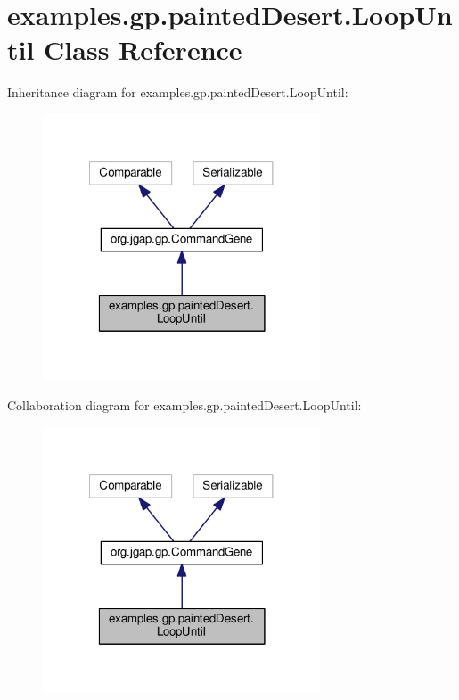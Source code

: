 \hypertarget{classexamples_1_1gp_1_1painted_desert_1_1_loop_until}{\section{examples.\-gp.\-painted\-Desert.\-Loop\-Until Class Reference}
\label{classexamples_1_1gp_1_1painted_desert_1_1_loop_until}
}


Inheritance diagram for examples.\-gp.\-painted\-Desert.\-Loop\-Until\-:
\nopagebreak
\begin{figure}[H]
\begin{center}
\leavevmode
\includegraphics[width=233pt]{classexamples_1_1gp_1_1painted_desert_1_1_loop_until__inherit__graph}
\end{center}
\end{figure}


Collaboration diagram for examples.\-gp.\-painted\-Desert.\-Loop\-Until\-:
\nopagebreak
\begin{figure}[H]
\begin{center}
\leavevmode
\includegraphics[width=233pt]{classexamples_1_1gp_1_1painted_desert_1_1_loop_until__coll__graph}
\end{center}
\end{figure}
